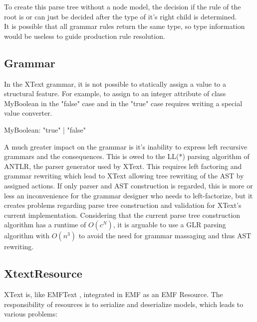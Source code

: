 To create this parse tree without a node model, the decision if the rule of the root  is  or  can just be decided after the type of it's right child  is determined. \\

It is possible that all grammar rules return the same type, so type information would be useless to guide production rule resolution.\\


\subsection{Grammar}
In the XText grammar, it is not possible to statically assign a value to a structural feature. For example, to assign  to an integer attribute  of class MyBoolean in the "false" case and  in the "true" case requires writing a special value converter. 
\begin{xtxt}
MyBoolean:  "true" | "false"
\end{xtxt}

A much greater impact on the grammar is it's inability to express left recursive grammars and the consequences. This is owed to the LL(*) parsing algorithm of ANTLR, the parser generator used by XText. This requires left factoring and grammar rewriting which lead to XText allowing tree rewriting of the AST by assigned actions. If only parser and AST construction is regarded, this is more or less an inconvenience for the grammar designer who needs to left-factorize, but it creates problems regarding parse tree construction and validation for XText's current implementation. Considering that the current parse tree construction algorithm has a runtime of $O(c^N)$, it is arguable to use a GLR parsing algorithm with $O(n^3)$ to avoid the need for grammar massaging and thus AST rewriting.

\subsection{XtextResource}
XText is, like EMFText \cite{EMFTextMan}, integrated in EMF as an EMF Resource. The responsibility of resources is to serialize and deserialize models, which leads to various problems: 

